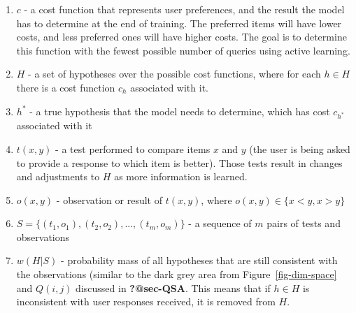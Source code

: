 \documentclass[
  letterpaper,
  numbers=noenddot,
  DIV=11]{scrreprt}
\theoremstyle{definition}
\theoremstyle{plain}
\theoremstyle{plain}
\theoremstyle{remark}
\begin{document}
\begin{enumerate}
\def\labelenumi{\arabic{enumi}.}
\item
  \(c\) - a cost function that represents user preferences, and the
  result the model has to determine at the end of training. The
  preferred items will have lower costs, and less preferred ones will
  have higher costs. The goal is to determine this function with the
  fewest possible number of queries using active learning.
\item
  \(H\) - a set of hypotheses over the possible cost functions, where
  for each \(h \in H\) there is a cost function \(c_h\) associated with
  it.
\item
  \(h^*\) - a true hypothesis that the model needs to determine, which
  has cost \(c_{h^*}\) associated with it
\item
  \(t(x,y)\) - a test performed to compare items \(x\) and \(y\) (the
  user is being asked to provide a response to which item is better).
  Those tests result in changes and adjustments to \(H\) as more
  information is learned.
\item
  \(o(x,y)\) - observation or result of \(t(x,y)\), where
  \(o(x,y) \in \{x<y, x>y\}\)
\item
  \(S = \{(t_1, o_1), (t_2, o_2),...,(t_m, o_m)\}\) - a sequence of
  \(m\) pairs of tests and observations
\item
  \(w(H|S)\) - probability mass of all hypotheses that are still
  consistent with the observations (similar to the dark grey area from
  Figure~\ref{fig-dim-space} and \(Q(i,j)\) discussed in
  \textbf{?@sec-QSA}. This means that if \(h \in H\) is inconsistent
  with user responses received, it is removed from \(H\).
\end{enumerate}
\end{document}

